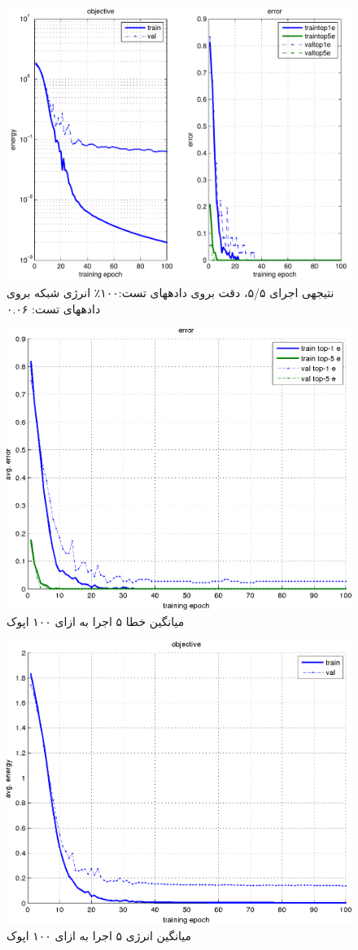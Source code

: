 \documentclass[10pt,a4paper]{article}
\newcommand{\نیمفاصله}{\halfspace}
\renewcommand{\ }{\halfspace}
\newcommand{\مق}{\lr}
\begin{document}
\begin{figure}
\centering
\includegraphics[width=.8\textwidth]{../sec_C/results/5.png}
\caption{نتیجه\ ی اجرای ۵/۵، دقت بروی داده\ های تست:۱۰۰٪ انرژی شبکه بروی داده\ های تست: ۰.۰۶}\label{fig:epoch5}
\end{figure}
\begin{figure}
\centering
\includegraphics[width=.8\textwidth]{../sec_C/results/error.png}
\caption{میانگین خطا ۵ اجرا به ازای ۱۰۰ اپوک}\label{fig:avg_mean}
\end{figure}
\begin{figure}
\centering
\includegraphics[width=.8\textwidth]{../sec_C/results/obj.png}
\caption{میانگین انرژی ۵ اجرا به ازای ۱۰۰ اپوک}\label{fig:avg_obj}
\end{figure}
\end{document}
